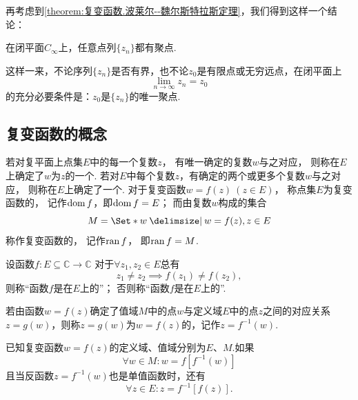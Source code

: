 再考虑到\cref{theorem:复变函数.波莱尔--魏尔斯特拉斯定理}，我们得到这样一个结论：
\begin{theorem}
在闭平面\(C_\infty\)上，任意点列\(\{z_n\}\)都有聚点.
\end{theorem}
这样一来，不论序列\(\{z_n\}\)是否有界，也不论\(z_0\)是有限点或无穷远点，在闭平面上\begin{equation*}
\lim_{n\to\infty} z_n = z_0
\end{equation*}的充分必要条件是：\(z_0\)是\(\{z_n\}\)的唯一聚点.

\subsection{复变函数的概念}
\begin{definition}
若对复平面上点集\(E\)中的每一个复数\(z\)，
有唯一确定的复数\(w\)与之对应，
则称在\(E\)上确定了\(w\)为\(z\)的一个.
若对\(E\)中每个复数\(z\)，有确定的两个或更多个复数\(w\)与之对应，
则称在\(E\)上确定了一个.
对于复变函数\(w = f(z)\ (z \in E)\)，
称点集\(E\)为复变函数的，
记作\(\operatorname{dom} f\)，即\(\operatorname{dom} f = E\)；
而由复数\(w\)构成的集合\begin{equation*}
	M = \Set*{ w \given w = f(z), z \in E }
\end{equation*}
称作复变函数的，
记作\(\operatorname{ran} f\)，
即\(\operatorname{ran} f = M\).
\end{definition}

\begin{definition}
设函数\(f\colon E\subseteq\mathbb{C}\to\mathbb{C}\)
对于\(\forall z_1,z_2 \in E\)总有\begin{equation*}
	z_1 \neq z_2
	\implies
	f(z_1) \neq f(z_2),
\end{equation*}
则称“函数\(f\)是在\(E\)上的”；
否则称“函数\(f\)是在\(E\)上的”.
\end{definition}

\begin{definition}
若由函数\(w=f(z)\)确定了值域\(M\)中的点\(w\)与定义域\(E\)中的点\(z\)之间的对应关系\(z=g(w)\)，则称\(z=g(w)\)为\(w=f(z)\)的，记作\(z=f^{-1}(w)\).
\end{definition}

\begin{property}
已知复变函数\(w=f(z)\)的定义域、值域分别为\(E\)、\(M\).如果\begin{equation*}
\forall w \in M: w=f[f^{-1}(w)]
\end{equation*}且当反函数\(z=f^{-1}(w)\)也是单值函数时，还有\begin{equation*}
\forall z \in E : z=f^{-1}[f(z)].
\end{equation*}
\end{property}

